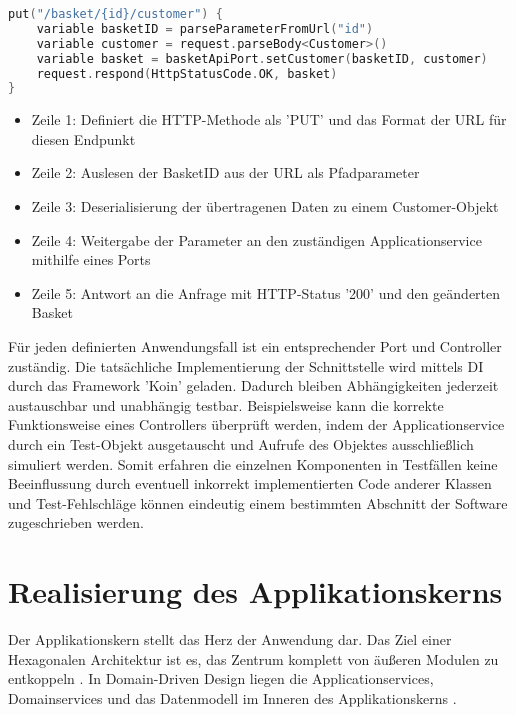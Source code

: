 \begin{minipage}{\linewidth} %
\begin{lstlisting}[caption={Beispiel eines Controllers zum Aktualisieren von Kundendaten}, label={lst:controller}, language=Kotlin]
put("/basket/{id}/customer") { 
	variable basketID = parseParameterFromUrl("id")
	variable customer = request.parseBody<Customer>()  
	variable basket = basketApiPort.setCustomer(basketID, customer)
	request.respond(HttpStatusCode.OK, basket)
}
\end{lstlisting}

\begin{itemize}[noitemsep,nolistsep]
	\item Zeile 1: Definiert die HTTP-Methode als 'PUT' und das Format der URL für diesen Endpunkt
	\item Zeile 2: Auslesen der BasketID aus der URL als Pfadparameter
	\item Zeile 3: Deserialisierung der übertragenen Daten zu einem Customer-Objekt
	\item Zeile 4: Weitergabe der Parameter an den zuständigen Applicationservice mithilfe eines Ports
	\item Zeile 5: Antwort an die Anfrage mit HTTP-Status '200' und den geänderten Basket
\end{itemize}
\end{minipage}

Für jeden definierten Anwendungsfall ist ein entsprechender Port und Controller zuständig. Die tatsächliche Implementierung der Schnittstelle wird mittels \Gls{DI} durch das Framework 'Koin' geladen. Dadurch bleiben Abhängigkeiten jederzeit austauschbar und unabhängig testbar. Beispielsweise kann die korrekte Funktionsweise eines Controllers überprüft werden, indem der Applicationservice durch ein Test-Objekt ausgetauscht und Aufrufe des Objektes ausschließlich simuliert werden. Somit erfahren die einzelnen Komponenten in Testfällen keine Beeinflussung durch eventuell inkorrekt implementierten Code anderer Klassen und Test-Fehlschläge können eindeutig einem bestimmten Abschnitt der Software zugeschrieben werden. \cite{DI_2007, Lindooren.2007}

\section{Realisierung des Applikationskerns}

Der Applikationskern stellt das Herz der Anwendung dar. Das Ziel einer Hexagonalen Architektur ist es, das Zentrum komplett von äußeren Modulen zu entkoppeln \cite{Cockburn.Hexagonal}. In Domain-Driven Design liegen die Applicationservices, Domainservices und das Datenmodell im Inneren des Applikationskerns \cite[S. 125ff.]{Vernon.2015}. 

